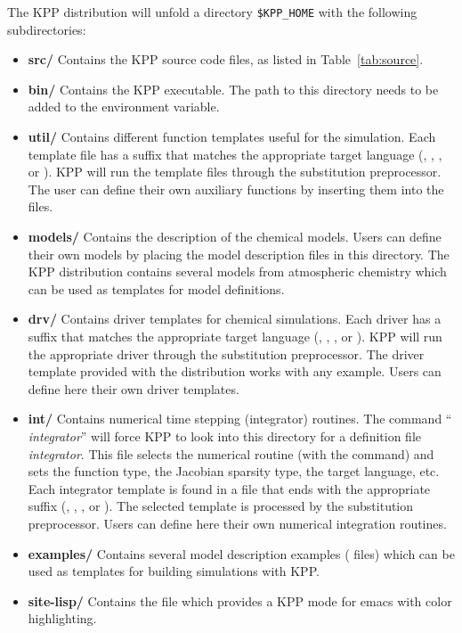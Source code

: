 \documentclass[twoside]{article}
\begin{document}
The KPP distribution will unfold a directory \verb|$KPP_HOME| with the
following subdirectories:
%
\begin{itemize}
\item {\bf src/} Contains the KPP source code files, as listed in
  Table~\ref{tab:source}.
\item {\bf bin/} Contains the KPP executable. The path to this directory
  needs to be added to the environment  variable.
\item {\bf util/} Contains different function templates useful for the
  simulation. Each template file has a suffix that matches the
  appropriate target language (, , , or
  ). KPP will run the template files through the substitution
  preprocessor. The user can define their own auxiliary functions by
  inserting them into the files.
\item {\bf models/} Contains the description of the chemical models.
  Users can define their own models by placing the model description
  files in this directory. The KPP distribution contains several models
  from atmospheric chemistry which can be used as templates for model
  definitions.
\item {\bf drv/} Contains driver templates for chemical simulations.
  Each driver has a suffix that matches the appropriate target language
  (, , , or ). KPP will run the
  appropriate driver through the substitution preprocessor. The driver
  template  provided with the distribution works with any
  example. Users can define here their own driver templates.
\item {\bf int/} Contains numerical time stepping (integrator) routines.
  The command `` {\it integrator}'' will force KPP to
  look into this directory for a definition file {\it
    integrator}. This file selects the numerical routine
  (with the  command) and sets the function type, the
  Jacobian sparsity type, the target language, etc. Each integrator
  template is found in a file that ends with the appropriate suffix
  (, , , or ). The selected
  template is processed by the substitution preprocessor. Users can
  define here their own numerical integration routines.
\item {\bf examples/} Contains several model description examples
  ( files) which can be used as templates for building
  simulations with KPP.
\item {\bf site-lisp/} Contains the file  which provides a
  KPP mode for emacs with color highlighting.
\end{itemize}
\end{document}
